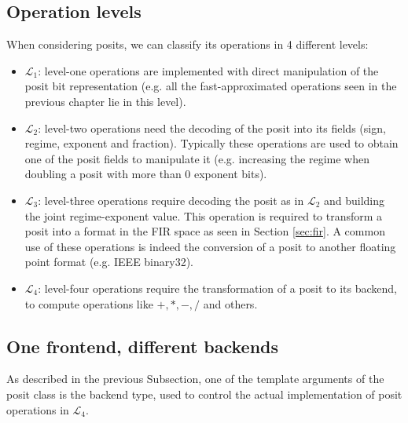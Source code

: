 \subsection{Operation levels}

When considering posits, we can classify its operations in 4 different levels:

\begin{itemize}
    \item $\mathcal{L}_1$: level-one operations are implemented with direct manipulation of the posit bit representation (e.g. all the fast-approximated operations seen in the previous chapter lie in this level).
    \item $\mathcal{L}_2$: level-two operations need the decoding of the posit into its fields (sign, regime, exponent and fraction). Typically these operations are used to obtain one of the posit fields to manipulate it (e.g. increasing the regime when doubling a posit with more than 0 exponent bits).
    \item $\mathcal{L}_3$: level-three operations require decoding the posit as in $\mathcal{L}_2$ and building the joint regime-exponent value. This operation is required to transform a posit into a format in the FIR space as seen in Section \ref{sec:fir}. A common use of these operations is indeed the conversion of a posit to another floating point format (e.g. IEEE binary32).
    \item $\mathcal{L}_4$: level-four operations require the transformation of a posit to its backend, to compute operations like $+,*,-,/$ and others.
\end{itemize}

\subsection{One frontend, different backends}

As described in the previous Subsection, one of the template arguments of the posit class is the backend type, used to control the actual implementation of posit operations in $\mathcal{L}_4$.

